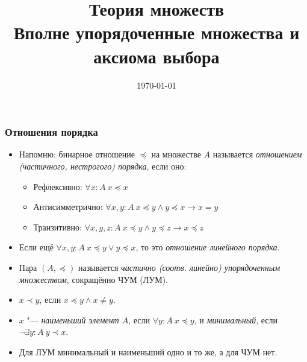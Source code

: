 \documentclass[10pt]{beamer}
\title{Теория множеств\\Вполне упорядоченные множества и аксиома выбора}
\date{\today}
\begin{document}
\begin{frame}[plain]
\maketitle
\end{frame}

\begin{frame}
    \frametitle{Отношения порядка}
    \begin{itemize}
        \item Напомню: бинарное отношение $\preccurlyeq$ на множестве $A$ называется \emph{отношением (частичного, нестрогого) порядка}, если оно:
        \begin{itemize}
            \item Рефлексивно: \( \forall x:A~ x \preccurlyeq x \)
            \item Антисимметрично: \( \forall x,y:A ~ x \preccurlyeq y \land y \preccurlyeq x \to x = y \)
            \item Транзитивно: \( \forall x,y,z:A ~ x \preccurlyeq y \land y \preccurlyeq z \to x \preccurlyeq z \)
        \end{itemize}
        \item Если ещё \( \forall x,y:A ~ x \preccurlyeq y \lor y \preccurlyeq x \), то это \emph{отношение линейного порядка}.
        \item Пара \((A, \preccurlyeq)\) называется \emph{частично (соотв. линейно) упорядоченным множеством}, сокращённо ЧУМ (ЛУМ).
        \item $x \prec y$, если $x \preccurlyeq y \land x \neq y$.
        \pause
        \item $x$ "--- \emph{наименьший элемент $A$}, если \(\forall y:A ~ x \preccurlyeq y\), и \emph{минимальный}, если \(\neg \exists y:A ~ y \prec x\).
        \item Для ЛУМ минимальный и наименьший одно и то же, а для ЧУМ нет.
    \end{itemize}
\end{frame}
\end{document}
